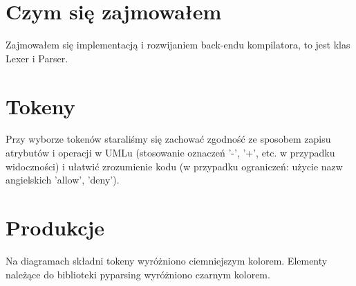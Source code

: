 \documentclass[a4paper,11pt,notitlepage]{article}
\begin{document}
\section{Czym się zajmowałem}
Zajmowałem się implementacją i rozwijaniem back-endu kompilatora, to jest klas Lexer i Parser.

\section{Tokeny}
Przy wyborze tokenów staraliśmy się zachować zgodność ze sposobem zapisu atrybutów i operacji w UMLu (stosowanie oznaczeń '-', '+', etc. w przypadku widoczności) i ułatwić zrozumienie kodu (w przypadku ograniczeń: użycie nazw angielskich 'allow', 'deny').


\section{Produkcje}
Na diagramach składni tokeny wyróżniono ciemniejszym kolorem. Elementy należące do biblioteki pyparsing wyróżniono czarnym kolorem.
\end{document}
